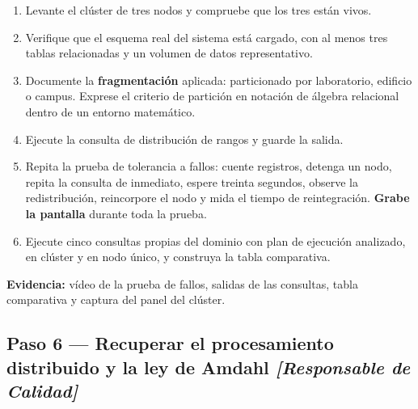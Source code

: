 \documentclass[11pt,a4paper]{article}
\newcommand{\paso}[1]{\subsection{#1}}
\begin{document}
	\begin{enumerate}[leftmargin=*,itemsep=4pt]
		\item Levante el clúster de tres nodos y compruebe que los tres están vivos.
		\item Verifique que el esquema real del sistema está cargado, con al menos tres tablas relacionadas y un volumen de datos representativo.
		\item Documente la \textbf{fragmentación} aplicada: particionado por laboratorio, edificio o campus. Exprese el criterio de partición en notación de álgebra relacional dentro de un entorno matemático.
		\item Ejecute la consulta de distribución de rangos y guarde la salida.
		\item Repita la prueba de tolerancia a fallos: cuente registros, detenga un nodo, repita la consulta de inmediato, espere treinta segundos, observe la redistribución, reincorpore el nodo y mida el tiempo de reintegración. \textbf{Grabe la pantalla} durante toda la prueba.
		\item Ejecute cinco consultas propias del dominio con plan de ejecución analizado, en clúster y en nodo único, y construya la tabla comparativa.
	\end{enumerate}
	
	\textbf{Evidencia:} vídeo de la prueba de fallos, salidas de las consultas, tabla comparativa y captura del panel del clúster.
	
	\paso{Paso 6 --- Recuperar el procesamiento distribuido y la ley de Amdahl \emph{[Responsable de Calidad]}}
	
\end{document}

